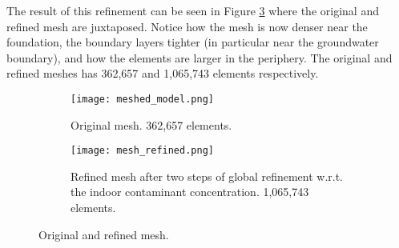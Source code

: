 The result of this refinement can be seen in Figure \ref{fig:mesh_refinement} where the original and refined mesh are juxtaposed.
Notice how the mesh is now denser near the foundation, the boundary layers tighter (in particular near the groundwater boundary), and how the elements are larger in the periphery.
The original and refined meshes has 362,657 and 1,065,743 elements respectively.\par

\begin{figure}[htb!]
  \centering
  \begin{subfigure}[b]{\textwidth}
    \texttt{[image: meshed\_model.png]}
    \caption{Original mesh. 362,657 elements.}
    \label{fig:mesh_before_refinement}
  \end{subfigure}
  \begin{subfigure}[b]{\textwidth}
    \texttt{[image: mesh\_refined.png]}
    \caption{Refined mesh after two steps of global refinement w.r.t. the indoor contaminant concentration. 1,065,743 elements.}
    \label{fig:mesh_after_refinement}
  \end{subfigure}
    \caption{Original and refined mesh.}
    \label{fig:mesh_refinement}
\end{figure}
